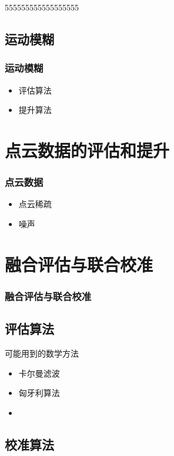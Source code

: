 555555555555555555\documentclass{beamer}
\begin{document}
\subsection{运动模糊}
\begin{frame}
  \frametitle{运动模糊}
  \begin{itemize}
  \item 评估算法
  \item 提升算法
  \end{itemize}

\end{frame}

\section{点云数据的评估和提升}
\begin{frame}
  \frametitle{点云数据}
  \begin{itemize}
\item 点云稀疏
\item 噪声
  \end{itemize}
\end{frame}

\section{融合评估与联合校准}
\begin{frame}
  \frametitle{融合评估与联合校准}
\subsection{评估算法}
可能用到的数学方法
\begin{itemize}
\item 卡尔曼滤波
\item 匈牙利算法
\item 
\end{itemize}
\subsection{校准算法}  
\end{frame}
\end{document}
